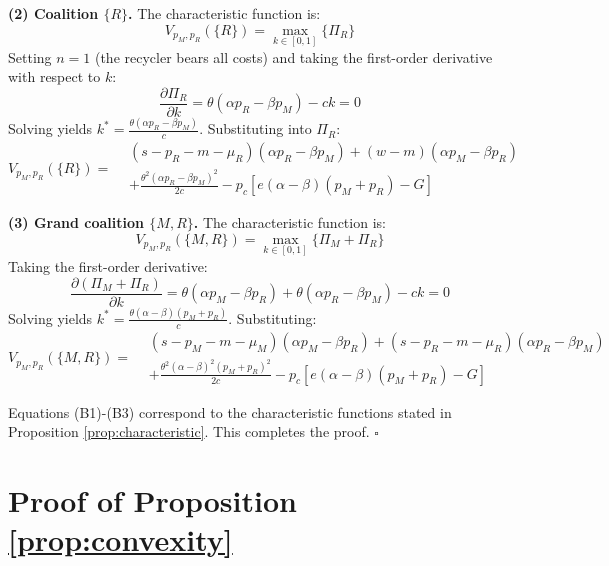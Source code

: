 \documentclass[authoryear,preprint,review,times,10pt]{elsarticle}
\begin{document}
\textbf{(2) Coalition $\{R\}$.} The characteristic function is:
\begin{equation}
V_{p_M,p_R}(\{R\}) = \max_{k \in [0,1]} \{\Pi_R\}
\end{equation}
Setting $n = 1$ (the recycler bears all costs) and taking the first-order derivative with respect to $k$:
\begin{equation}
\frac{\partial \Pi_R}{\partial k} = \theta(\alpha p_R - \beta p_M) - ck = 0
\end{equation}
Solving yields $k^* = \frac{\theta(\alpha p_R - \beta p_M)}{c}$. Substituting into $\Pi_R$:
\begin{equation}
V_{p_M,p_R}(\{R\}) =
\begin{aligned}
& \left(s - p_R - m - \mu_R\right)(\alpha p_R - \beta p_M) + (w - m)(\alpha p_M - \beta p_R) \\
& + \frac{\theta^2(\alpha p_R - \beta p_M)^2}{2c} - p_c\left[ e(\alpha-\beta)(p_M+p_R)-G\right]
\end{aligned}
\tag{B2}
\end{equation}

\textbf{(3) Grand coalition $\{M,R\}$.} The characteristic function is:
\begin{equation}
V_{p_M,p_R}(\{M,R\}) = \max_{k \in [0,1]} \{\Pi_M + \Pi_R\}
\end{equation}
Taking the first-order derivative:
\begin{equation}
\frac{\partial (\Pi_M + \Pi_R)}{\partial k} = \theta(\alpha p_M - \beta p_R) + \theta(\alpha p_R - \beta p_M) - ck = 0
\end{equation}
Solving yields $k^* = \frac{\theta(\alpha - \beta)(p_M + p_R)}{c}$. Substituting:
\begin{equation}
V_{p_M,p_R}(\{M,R\}) =
\begin{aligned}
& (s - p_M - m - \mu_M)(\alpha p_M - \beta p_R) + (s - p_R - m - \mu_R)(\alpha p_R - \beta p_M) \\
& + \frac{\theta^2(\alpha - \beta)^2(p_M + p_R)^2}{2c} - p_c\left[ e(\alpha-\beta)(p_M+p_R)-G\right]
\end{aligned}
\tag{B3}
\end{equation}

Equations (B1)-(B3) correspond to the characteristic functions stated in Proposition \ref{prop:characteristic}. This completes the proof. \hfill $\square$

\section{Proof of Proposition \ref{prop:convexity}}
\label{app:prop3}
\end{document}
